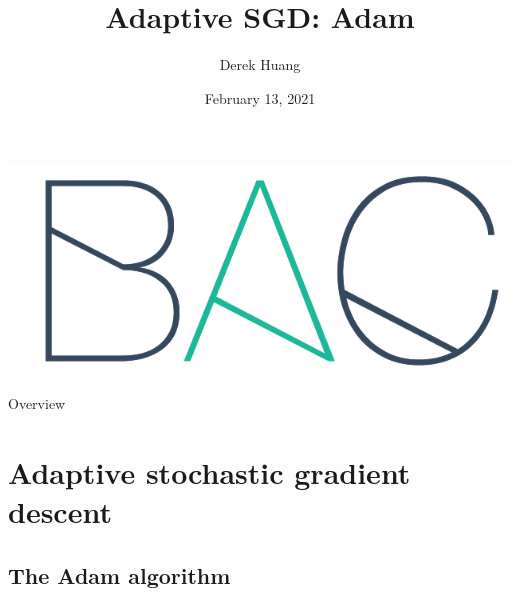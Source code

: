 \documentclass{beamer}
\title[Adaptive SGD: Adam]{Adaptive SGD: Adam}
\author[Derek Huang (BAC Advanced Team)]{Derek Huang}
\institute[BAC Advanced Team]{BAC Advanced Team}
\date{February 13, 2021}
\numberwithin{equation}{section}
\begin{document}
\begin{frame}
    \titlepage
    \centering
    \includegraphics[scale = 0.1]{bac_logo1.png}
\end{frame}

\begin{frame}{Overview}
    \tableofcontents
\end{frame}

\section{Adaptive stochastic gradient descent}

\subsection{The Adam algorithm}
\end{document}

